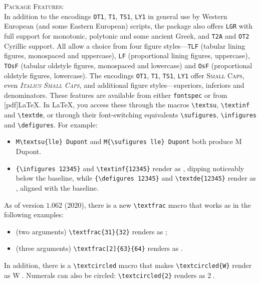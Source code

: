 \documentclass[11pt]{article}
\begin{document}
\textsc{Package Features:}\\
In addition to the encodings {\tt OT1}, {\tt T1}, {\tt TS1}, {\tt LY1} in general use by Western European (and some Eastern European) scripts, the package also offers {\tt LGR} with full support for monotonic, polytonic and some ancient Greek, and {\tt T2A} and {\tt OT2} Cyrillic support. All allow a choice from four figure styles---{\tt TLF} (tabular lining figures, monospaced and uppercase), {\tt LF} (proportional lining figures, uppercase), {\tt TOsF} (tabular oldstyle figures, monospaced and lowercase) and {\tt OsF} (proportional oldstyle figures, lowercase). The encodings {\tt OT1}, {\tt T1}, {\tt TS1}, {\tt LY1} offer \textsc{Small Caps}, even \textsc{\textit{Italics Small Caps}}, and additional figure styles---superiors, inferiors and denominators. These features are available from either \verb|fontspec| or from [pdf]\LaTeX. In \LaTeX, you access these through the macros \verb|\textsu|, \verb|\textinf| and  \verb|\textde|, or through their font-switching equivalents \verb|\sufigures|, \verb|\infigures| and  \verb|\defigures|. For example:
\begin{itemize}
\item
\verb|M\textsu{lle} Dupont| and \verb|M{\sufigures lle} Dupont| both produce M Dupont.
\item \verb|{\infigures 12345}| and \verb|\textinf{12345}| render as , dipping noticeably below the baseline,  while \verb|{\defigures 12345}| and \verb|\textde{12345}| render as , aligned with the baseline.
\end{itemize}
As of version $1.062$ ($2020$), there is a new \verb|\textfrac| macro that works as in the following examples:
\begin{itemize}
\item
(two arguments) \verb|\textfrac{31}{32}| renders as ;
\item
(three arguments) \verb|\textfrac[2]{63}{64}| renders as .
\end{itemize}
In addition, there is a \verb|\textcircled| macro that makes \verb|\textcircled{W}| render as \textcircled{W}. Numerals can also be circled: \verb|\textcircled{2}| renders as \textcircled{2}.
\end{document}
